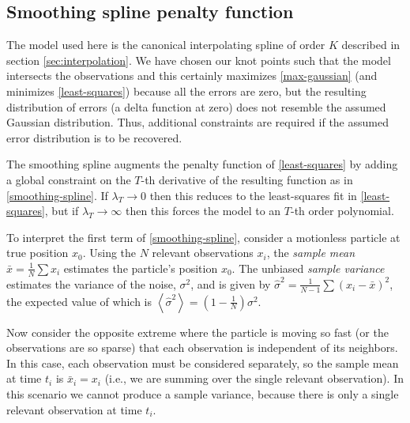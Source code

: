 \documentclass{ametsoc}
\begin{document}
\subsection{Smoothing spline penalty function}
\label{subsec:smoothing_spline_penalty_function}

The model used here is the canonical interpolating spline of order $K$ described in section \ref{sec:interpolation}. We have chosen our knot points such that the model intersects the observations and this certainly maximizes \eqref{max-gaussian} (and minimizes \eqref{least-squares}) because all the errors are zero, but the resulting distribution of errors (a delta function at zero) does not resemble the assumed Gaussian distribution. Thus, additional constraints are required if the assumed error distribution is to be recovered.

The smoothing spline augments the penalty function of \eqref{least-squares} by adding a global constraint on the $T$-th derivative of the resulting function as in \eqref{smoothing-spline}.
If $\lambda_T \rightarrow 0$ then this reduces to the least-squares fit in \eqref{least-squares}, but if $\lambda_T \rightarrow \infty$ then this forces the model to an $T$-th order polynomial.

To interpret the first term of \eqref{smoothing-spline}, consider a motionless particle at true position $x_0$. Using the $N$ relevant observations $x_i$, the \emph{sample mean} $\bar{x} = \frac{1}{N} \sum x_i$ estimates the particle's position $x_0$. The unbiased \emph{sample variance} estimates the variance of the noise, $\sigma^2$, and is given by $\hat{\sigma}^2=\frac{1}{N-1} \sum (x_i-\bar{x})^2$, the expected value of which is $\left\langle \hat{\sigma}^2 \right\rangle = \left(1-\frac{1}{N}\right)\sigma^2$.

Now consider the opposite extreme where the particle is moving so fast (or the observations are so sparse) that each observation is independent of its neighbors. In this case, each observation must be considered separately, so the sample mean at time $t_i$ is $\bar{x}_i = x_i$ (i.e., we are summing over the single relevant observation). In this scenario we cannot produce a sample variance, because there is only a single relevant observation at time $t_i$.
\end{document}
